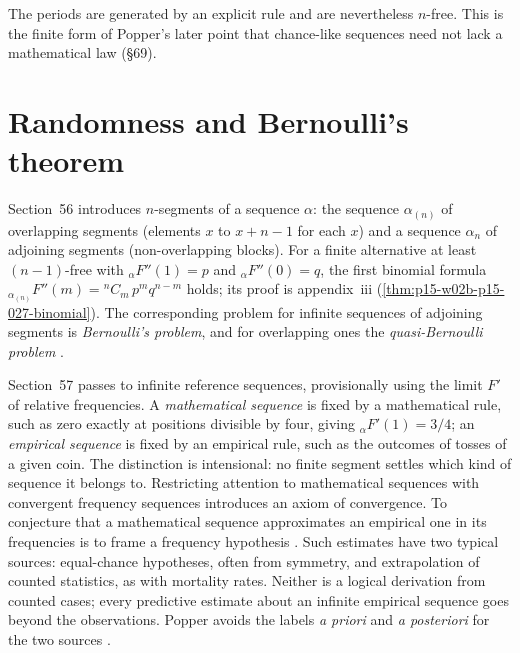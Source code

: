 The periods are generated by an explicit rule and are nevertheless
\(n\)-free. This is the finite form of Popper's later point that
chance-like sequences need not lack a mathematical law (\S69).

\section{Randomness and Bernoulli's theorem}
\label{sec:p15-w02b-p15-027-bernoulli}

Section~56 introduces \(n\)-segments of a sequence \(\alpha\): the
sequence \(\alpha_{(n)}\) of overlapping segments (elements \(x\) to
\(x+n-1\) for each \(x\)) and a sequence \(\alpha_n\) of adjoining
segments (non-overlapping blocks). For a finite alternative at least
\((n-1)\)-free with \({}_{\alpha}F''(1)=p\) and \({}_{\alpha}F''(0)=q\), the
first binomial formula
\({}_{\alpha_{(n)}}F''(m)={}^nC_m\,p^mq^{n-m}\) holds; its proof is
appendix~iii (\cref{thm:p15-w02b-p15-027-binomial}). The corresponding
problem for infinite sequences of adjoining segments is
\emph{Bernoulli's problem}, and for overlapping ones the
\emph{quasi-Bernoulli problem}
\parencite[\S56 and note~1]{Popper2002LogicDiscoveryUI}.

Section~57 passes to infinite reference sequences, provisionally using
the limit \(F'\) of relative frequencies. A \emph{mathematical sequence}
is fixed by a mathematical rule, such as zero exactly at positions
divisible by four, giving \({}_{\alpha}F'(1)=3/4\); an \emph{empirical
sequence} is fixed by an empirical rule, such as the outcomes of tosses
of a given coin. The distinction is intensional: no finite segment
settles which kind of sequence it belongs to. Restricting attention to
mathematical sequences with convergent frequency sequences introduces
an axiom of convergence. To conjecture that a mathematical sequence
approximates an empirical one in its frequencies is to frame a
frequency hypothesis \parencite[\S57]{Popper2002LogicDiscoveryUI}.
Such estimates have two typical sources: equal-chance hypotheses, often
from symmetry, and extrapolation of counted statistics, as with
mortality rates. Neither is a logical derivation from counted cases;
every predictive estimate about an infinite empirical sequence goes
beyond the observations. Popper avoids the labels \emph{a priori} and
\emph{a posteriori} for the two sources
\parencite[\S57]{Popper2002LogicDiscoveryUI}.

